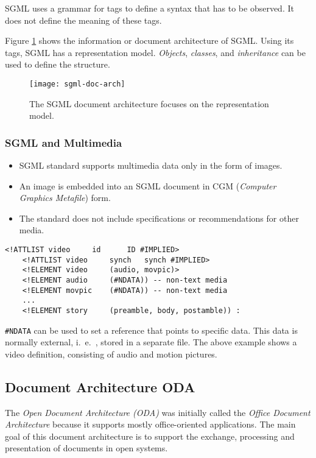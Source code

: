 SGML uses a grammar for tags to define a syntax that has to be observed. It does not define the meaning of these tags.

Figure {\ref{fig:sgml-doc-arch}} shows the information or document architecture of SGML. Using its tags, SGML has a representation model. \textit{Objects}, \textit{classes}, and \textit{inheritance} can be used to define the structure.


\begin{figure}[ht!]
	\centering
	\texttt{[image: sgml-doc-arch]}
	\caption{The SGML document architecture focuses on the representation model.}{\label{fig:sgml-doc-arch}}
\end{figure}

\subsubsection*{SGML and Multimedia}
\begin{multicols}{2}
	\begin{itemize}
		\item SGML standard supports multimedia data only in the form of images. 
		\item An image is embedded into an SGML document in CGM (\textit{Computer Graphics Metafile}) form. 
		\item The standard does not include specifications or recommendations for other media.
	\end{itemize}
\end{multicols}


\begin{lstlisting}[frame=single]
	<!ATTLIST video 	id 		ID #IMPLIED>
	<!ATTLIST video 	synch 	synch #IMPLIED>
	<!ELEMENT video 	(audio, movpic)>
	<!ELEMENT audio 	(#NDATA)) -- non-text media
	<!ELEMENT movpic 	(#NDATA)) -- non-text media
	...
	<!ELEMENT story 	(preamble, body, postamble)) :
\end{lstlisting}

\verb|#NDATA| can be used to set a reference that points to specific data. This data is normally external, i.\ e.\ , stored in a separate file. The above example shows a video definition, consisting of audio and motion pictures.



\subsection[ODA]{Document Architecture ODA}
The \textit{Open Document Architecture (ODA)} was initially called the \textit{Office Document Architecture} because it supports mostly office-oriented applications. The main goal of this document architecture is to support the exchange, processing and presentation of documents in open systems.

